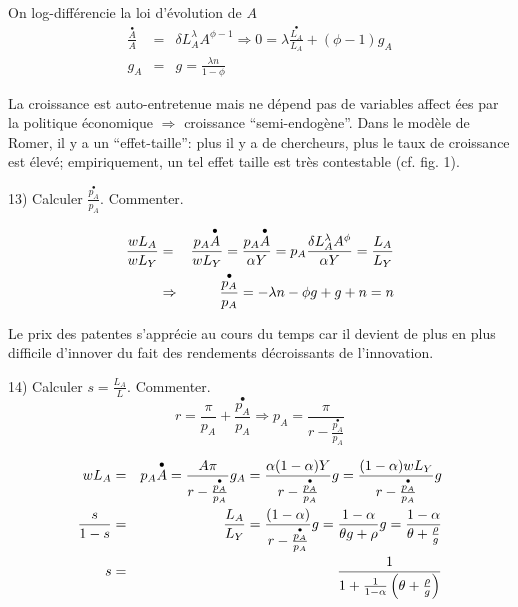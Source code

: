 \documentclass[a4paper]{article}
\begin{document}
On log-diff\'{e}rencie la loi d'\'{e}volution de $A$%
\begin{eqnarray*}
\frac{\overset{\bullet }{A}}{A} &=&\delta L_{A}^{\lambda }A^{\phi
-1}\Rightarrow 0=\lambda \frac{\overset{\bullet }{L_{A}}}{L_{A}}+\left( \phi
-1\right) g_{A} \\
g_{A} &=&g=\frac{\lambda n}{1-\phi }
\end{eqnarray*}

La croissance est auto-entretenue mais ne d\'{e}pend pas de variables affect%
\'{e}es par la politique \'{e}conomique $\Rightarrow $ croissance
\textquotedblleft semi-endog\`{e}ne\textquotedblright . Dans le mod\`{e}le
de Romer, il y a un \textquotedblleft effet-taille\textquotedblright : plus
il y a de chercheurs, plus le taux de croissance est \'{e}lev\'{e};
empiriquement, un tel effet taille est tr\`{e}s contestable (cf. fig. 1).

\begin{center}

\bigskip
\end{center}

13) Calculer $\frac{\overset{\bullet }{p_{A}}}{p_{A}}$. Commenter.

\begin{eqnarray*}
\frac{wL_{A}}{wL_{Y}} &=&\frac{p_{A}\overset{\bullet }{A}}{wL_{Y}}=\frac{%
p_{A}\overset{\bullet }{A}}{\alpha Y}=p_{A}\frac{\delta L_{A}^{\lambda
}A^{\phi }}{\alpha Y}=\frac{L_{A}}{L_{Y}} \\
&\Rightarrow &\frac{\overset{\bullet }{p_{A}}}{p_{A}}=-\lambda n-\phi g+g+n=n
\end{eqnarray*}

Le prix des patentes s'appr\'{e}cie au cours du temps car il devient de plus
en plus difficile d'innover du fait des rendements d\'{e}croissants de
l'innovation.

\bigskip

14) Calculer $s=\frac{L_{A}}{L}$. Commenter.
\begin{equation*}
r=\frac{\pi }{p_{A}}+\frac{\overset{\bullet }{p_{A}}}{p_{A}}\Rightarrow
p_{A}=\frac{\pi }{r-\frac{\overset{\bullet }{p_{A}}}{p_{A}}}
\end{equation*}

\begin{eqnarray*}
wL_{A} &=&p_{A}\overset{\bullet }{A}=\frac{A\pi }{r-\frac{\overset{\bullet }{%
p_{A}}}{p_{A}}}g_{A}=\frac{\alpha (1-\alpha )Y}{r-\frac{\overset{\bullet }{%
p_{A}}}{p_{A}}}g=\frac{(1-\alpha )wL_{Y}}{r-\frac{\overset{\bullet }{p_{A}}}{%
p_{A}}}g \\
\frac{s}{1-s} &=&\frac{L_{A}}{L_{Y}}=\frac{(1-\alpha )}{r-\frac{\overset{%
\bullet }{p_{A}}}{p_{A}}}g=\frac{1-\alpha }{\theta g+\rho }g=\frac{1-\alpha 
}{\theta +\frac{\rho }{g}} \\
s &=&\frac{1}{1+\frac{1}{1-\alpha }\left( \theta +\frac{\rho }{g}\right) }
\end{eqnarray*}
\end{document}
